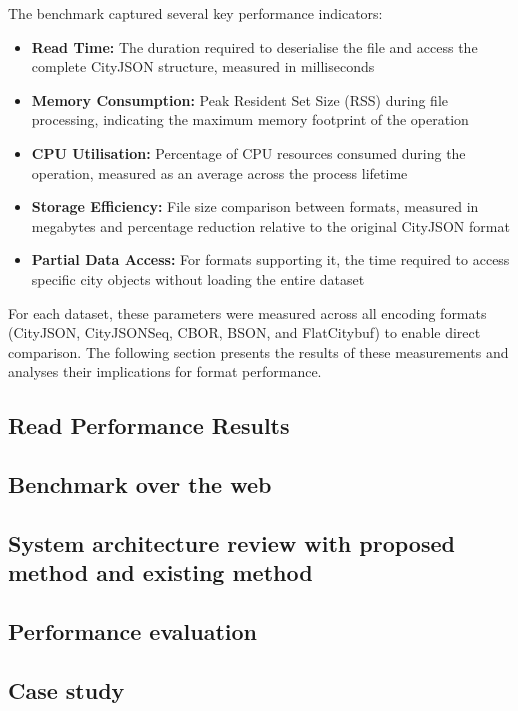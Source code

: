 The benchmark captured several key performance indicators:

\begin{itemize}
  \item \textbf{Read Time:} The duration required to deserialise the file and access the complete CityJSON structure, measured in milliseconds

  \item \textbf{Memory Consumption:} Peak Resident Set Size (RSS) during file processing, indicating the maximum memory footprint of the operation

  \item \textbf{CPU Utilisation:} Percentage of CPU resources consumed during the operation, measured as an average across the process lifetime

  \item \textbf{Storage Efficiency:} File size comparison between formats, measured in megabytes and percentage reduction relative to the original CityJSON format

  \item \textbf{Partial Data Access:} For formats supporting it, the time required to access specific city objects without loading the entire dataset
\end{itemize}

For each dataset, these parameters were measured across all encoding formats (CityJSON, CityJSONSeq, CBOR, BSON, and FlatCitybuf) to enable direct comparison. The following section presents the results of these measurements and analyses their implications for format performance.

\subsection{Read Performance Results}
\label{result:benchmark_on_local_environment:read_performance_results}

\subsection{Benchmark over the web}
\label{result:benchmark_on_local_environment:benchmark_over_the_web}

\subsection{System architecture review with proposed method and existing method}
\label{result:overview:system_architecture_review_with_proposed_method_and_existing_method}

\subsection{Performance evaluation}
\label{result:overview:performance_evaluation}

\subsection{Case study}
\label{result:overview:case_study}
